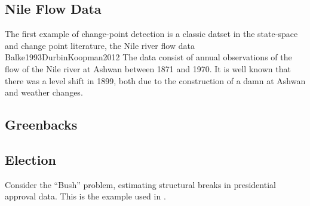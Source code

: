 \documentclass{article}
\begin{document}
\subsection{Nile Flow Data}
\label{sec:nile}

The first example of change-point detection is a classic datset in the state-space and change point literature, the Nile river flow data \textcite{Cobb1978}{Balke1993}{DurbinKoopman2012}
The data consist of annual observations of the flow of the Nile river at Ashwan between 1871 and 1970. 
It is well known that there was a level shift in 1899, both due to the construction of a damn at Ashwan and weather changes.

\subsection{Greenbacks}
\label{sec:greenbacks-graybacks}

\subsection{Election}
\label{sec:election}

Consider the ``Bush'' problem, estimating structural breaks in
presidential approval data. This is the example used in
\textcite{RatkovicEng2010}.

\printbibliography{}
\end{document}

